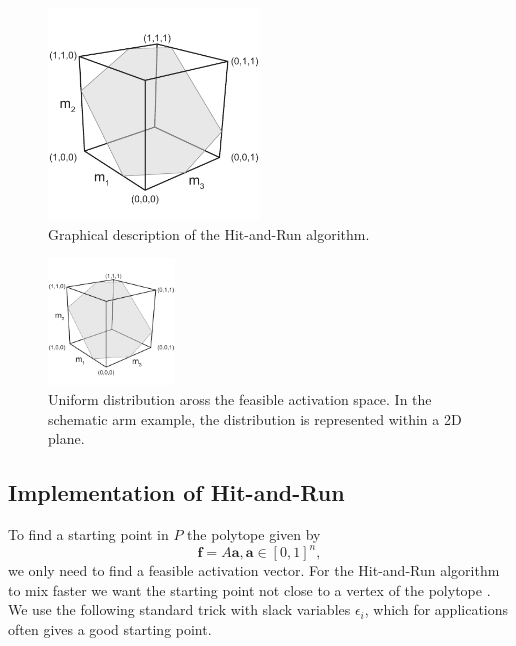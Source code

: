\begin{figure}[h]
\centering
\includegraphics[width=0.5\textwidth,page=10]{sections/figs/HitandRunSchematics_all.pdf}
\caption{Graphical description of the Hit-and-Run algorithm.}
\label{fig:hitruncube}
\end{figure}

\begin{figure}[h]
\centering
\includegraphics[width=0.3\textwidth,page=9]{sections/figs/HitandRunSchematics_all.pdf}
\caption{Uniform distribution aross the feasible activation space. In the schematic arm example, the distribution is represented within a 2D plane.}
\label{fig:posthitrun_distribution}
\end{figure}

\subsection{Implementation of Hit-and-Run}
To find a starting point in $P$ the polytope given by
\[\textbf{f} = A\textbf{a}, \textbf{a} \in [0,1]^n,\]
we only need to find a feasible activation vector. For the Hit-and-Run algorithm to mix faster we want the starting point not close to a vertex of the polytope \cite{Lovasz}. %
We use the following standard trick with slack variables $\epsilon_i$, which for applications often gives a good starting point.%

